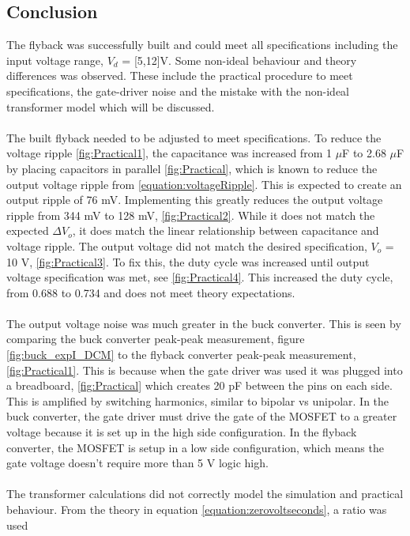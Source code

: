 \documentclass[12pt,twoside]{scrartcl}
\begin{document}
\newpage
\subsection{Conclusion}
The flyback was successfully built and could meet all specifications 
including the input voltage range, $V_d$ = [5,12]V. 
Some non-ideal behaviour and theory differences was observed. 
These include the practical procedure to meet specifications, the gate-driver noise and the mistake with the
non-ideal transformer model which will be discussed. 
\\\\
The built flyback needed to be adjusted to meet specifications. To reduce the voltage ripple \ref{fig:Practical1}, the capacitance was increased 
from 1 $\mu$F to 2.68 $\mu$F by placing capacitors in parallel \ref{fig:Practical}, which is known to reduce
the output voltage ripple from \ref{equation:voltageRipple}. This is 
expected to create an output ripple of 76 mV. Implementing this greatly reduces the output voltage ripple from 344 mV to 128 mV, 
\ref{fig:Practical2}. While it does not match the expected $\Delta V_o$, it does match the linear 
relationship between capacitance and voltage ripple. The output voltage did not match the desired 
specification, $V_o$ = 10 V, \ref{fig:Practical3}. To fix this, the duty cycle was increased
until output voltage specification was met, see \ref{fig:Practical4}. This increased the duty cycle,
from 0.688 to 0.734 and does not meet theory expectations. 
\\\\
The output voltage noise was much greater in the buck converter. This is seen by comparing the buck converter peak-peak measurement, figure \ref{fig:buck_expI_DCM}
to the flyback converter peak-peak measurement, \ref{fig:Practical1}.  
This is because when the gate driver was used it was plugged into a breadboard, \ref{fig:Practical} which creates 20 pF between the pins on each side. This is amplified 
by switching harmonics, similar to bipolar vs unipolar. In the buck converter,
the gate driver must drive the gate of the MOSFET to a greater voltage because it is set up in the high side configuration. 
In the flyback converter, the MOSFET is setup in a low side configuration, which means the gate voltage doesn't require more than 5 V logic high.
\\\\
The transformer calculations did not correctly model the simulation and practical behaviour. From the theory in equation \ref{equation:zerovoltseconds}, a ratio was used 
\end{document}
